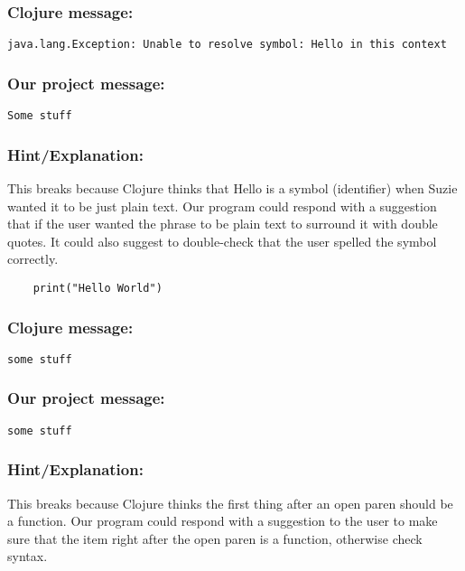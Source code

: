 \documentclass[12pt]{article}
\begin{document}
{\addtolength{\leftskip}{10mm}
	\subsubsection*{Clojure message:}

	\verb|java.lang.Exception: Unable to resolve symbol: Hello in this context|

	\subsubsection*{Our project message:}
	
	\verb|Some stuff|

	\subsubsection*{Hint/Explanation:}

This breaks because Clojure thinks that Hello is a symbol (identifier) when Suzie 	wanted it to be just plain text. Our program could respond with a suggestion that if the user wanted the phrase to be plain text to surround it with double quotes. It could also suggest to double-check that the user spelled the symbol correctly.

}

\begin{verbatim}
	print("Hello World")
\end{verbatim}

{\addtolength{\leftskip}{10mm}

	\subsubsection*{Clojure message:}
	
	\verb|some stuff|

	\subsubsection*{Our project message:}
	
	\verb|some stuff|
	
	\subsubsection*{Hint/Explanation:}

This breaks because Clojure thinks the first thing after an open paren should be a function. Our program could respond with a suggestion to the user to make sure that the item right after the open paren is a function, otherwise check syntax. 

}
\end{document}

